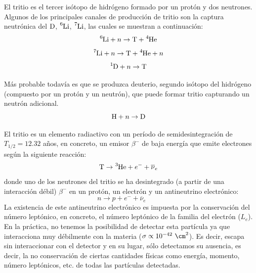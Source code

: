 El tritio  es el tercer isótopo de hidrógeno formado por un protón y dos neutrones. Algunos de los principales canales de producción de tritio son la captura neutrónica del $\ce{D}$, $\ce{^6Li}$, $\ce{^7Li}$,  las cuales se muestran a continuación:
\begin{equation}
\ce{^{6}Li} + n \rightarrow \ce{T} + \ce{^{4}He}
\label{capneuLi6}
\end{equation}
\begin{equation}
\ce{^{7}Li} + n \rightarrow  \ce{T} + \ce{^{4}He} + n
\label{capneuLi7}
\end{equation}
\begin{equation}
\ce{^{1}D} + n \rightarrow  \ce{T}  
\label{capneuH}
\end{equation}

Más probable todavía es que se produzca deuterio, segundo isótopo del hidrógeno (compuesto por un protón y un neutrón), que puede formar tritio capturando un neutrón adicional. 
\begin{equation}
\ce{H} + n \rightarrow  \ce{D}  
\label{capneuD}
\end{equation}


El tritio es  un elemento radiactivo con un período de semidesintegración de $T_{1/2}=12.32$ años, en concreto, un emisor $\beta^-$ de baja energía que emite electrones según la siguiente reacción:
\begin{equation}
\ce{T} \rightarrow \ce{^{3}He} + e^- + \overline{\nu}_e
\label{desintegraciontritio}
\end{equation}
donde  uno de los neutrones del tritio se ha desintegrado (a partir de una interacción débil)  $\beta^-$ en un protón, un electrón y un antineutrino electrónico:
\begin{equation}
n \rightarrow p + e^- + \overline{\nu}_e \qquad 
\label{desintegracionbeta}
\end{equation}
La existencia de este antineutrino electrónico es impuesta por la conservación del número leptónico, en concreto, el número leptónico de la familia del electrón ($L_e$). En la práctica, no tenemos la posibilidad de detectar esta partícula ya que interacciona muy débilmente con la materia ($\sigma \propto 10^{-42}~\cm^2$).  Es decir, escapa sin interaccionar con el detector y en su lugar, sólo detectamos su ausencia, es decir, la no conservación de ciertas cantidades físicas como energía, momento, número leptónicos, etc. de todas  las partículas detectadas.

